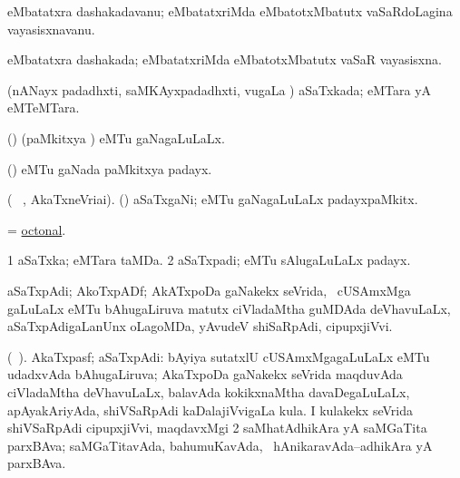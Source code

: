 \bentry
{}
\gl{\nA}
\bmng
eMbatatxra dashakadavanu; eMbatatxriMda eMbatotxMbatutx vaSaRdoLagina vayasisxnavanu. 
\emng
\eentry

\bentry
{}
\gl{\gu}
\bmng
eMbatatxra dashakada; eMbatatxriMda eMbatotxMbatutx vaSaR vayasisxna. 
\emng
\eentry

\bentry
{}
\gl{\gu}
\bmng
(nANayx padadhxti, saMKAyxpadadhxti, \mo vugaLa \vi) aSaTxkada; eMTara yA eMTeMTara. 
\emng
\eentry

\bentry
{}
\gl{\gu}
\bmng
(\CaM) (paMkitxya \vi) eMTu gaNagaLuLaLx. 
\emng
\eentry

\bentry
{}
\gl{\nA}
\bmng
(\CaM) eMTu gaNada paMkitxya padayx. 
\emng
\eentry

\bentry
{}
\gl{\nA}
\bmng
(\bava\  \ucAcx, AkaTxneVriai). (\CaM) aSaTxgaNi; eMTu gaNagaLuLaLx padayxpaMkitx. 
\emng
\eentry

\bentry
{}
\gl{\gu}
\bmng
= \hyperlink{octonal}{octonal}. 
\emng
\eentry

\bentry
{}
\gl{\nA}
\bmng
\bnum
\num{1} aSaTxka; eMTara taMDa. 
\num{2} aSaTxpadi; eMTu sAlugaLuLaLx padayx. 
\enum
\emng
\eentry

\bentry
{}
\gl{\nA}
\bmng
aSaTxpAdi; AkoTxpADf; AkATxpoDa gaNakekx seVrida, \sA\ cUSAmxMga gaLuLaLx eMTu bAhugaLiruva matutx ciVladaMtha guMDAda deVhavuLaLx, aSaTxpAdigaLanUnx oLagoMDa, yAvudeV shiSaRpAdi, cipupxjiVvi. 
\emng
\eentry

\bentry
{}
\gl{\nA}
\bmng
(\bava\ ). 
\bnum
{} AkaTxpasf; aSaTxpAdi: 
\banum
{} bAyiya sutatxlU cUSAmxMgagaLuLaLx eMTu udadxvAda bAhugaLiruva; AkaTxpoDa gaNakekx seVrida maqduvAda ciVladaMtha deVhavuLaLx, balavAda kokikxnaMtha davaDegaLuLaLx, apAyakAriyAda, shiVSaRpAdi kaDalajiVvigaLa kula.  
 I kulakekx seVrida shiVSaRpAdi cipupxjiVvi, maqdavxMgi 
\eanum
\numie
\num{2} saMhatAdhikAra yA saMGaTita parxBAva; saMGaTitavAda, bahumuKavAda, \sA\ hAnikaravAda--adhikAra yA parxBAva. 
\enum
\emng
\eentry

